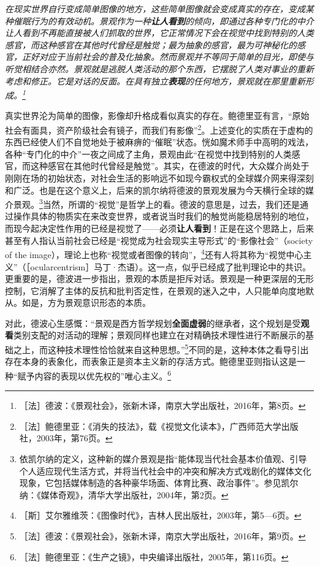 \documentclass[fontset=fandol, a4paper, 12pt, openright]{ctexbook}
\renewenvironment{quote}
  {\list{}{\rightmargin\leftmargin}%
   \item\relax\small\itshape\color{darkgray}}
  {\endlist}
\begin{document}
\begin{quote}
在现实世界自行变成简单图像的地方，这些简单图像就会变成真实的存在，变成某种催眠行为的有效动机。景观作为一种\textbf{让人看到}的倾向，即通过各种专门化的中介让人看到不再能直接被人们抓取的世界，它正常情况下会在视觉中找到特别的人类感官，而这种感官在其他时代曾经是触觉；最为抽象的感官，最为可神秘化的感官，正好对应于当前社会的普及化抽象。然而景观并不等同于简单的目光，即使与听觉相结合亦然。景观就是逃脱人类活动的那个东西，它摆脱了人类对事业的重新考虑和修正。它是对话的反面。在具有独立\textbf{表现}的任何地方，景观就在那里重新形成。\footnote{［法］德波：《景观社会》，张新木译，南京大学出版社，2016年，第8页。}
\end{quote}

真实世界沦为简单的图像，影像却升格成看似真实的存在。{\kaishu 鲍德里亚有言，“原始社会有面具，资产阶级社会有镜子，而我们有影像”\footnote{［法］鲍德里亚：《消失的技法》，载《视觉文化读本》，广西师范大学出版社，2003年，第76页。}。}上述变化的实质在于虚构的东西已经使人们不自觉地处于被麻痹的“催眠”状态。恍如魔术师手中高明的戏法，各种“专门化的中介”一夜之间成了主角，景观由此“在视觉中找到特别的人类感官，而这种感官在其他时代曾经是触觉”。{\kaishu 其实，在德波的时代，大众媒介尚处于刚刚在场的初始状态，对社会生活的影响远不如现今霸权式的全球媒介网来得深刻和广泛。也是在这个意义上，后来的凯尔纳将德波的景观发展为今天横行全球的媒介景观。\footnote{依凯尔纳的定义，这种新的媒介景观是指“能体现当代社会基本价值观、引导个人适应现代生活方式，并将当代社会中的冲突和解决方式戏剧化的媒体文化现象，它包括媒体制造的各种豪华场面、体育比赛、政治事件”。参见凯尔纳：《媒体奇观》，清华大学出版社，2004年，第2页。}}当然，所谓的“视觉”是哲学上的看。德波的意思是，过去，我们还是通过操作具体的物质实在来改变世界，或者说当时我们的触觉尚能稳居特别的地位，而现今起决定性作用的已经是视觉了——必须\textbf{让人看到}！{\kaishu 正是在这个思路上，后来甚至有人指认当前社会已经是“视觉成为社会现实主导形式”的“影像社会”（society of the image），理论上也称“视觉或者图像的转向”，\footnote{［斯］艾尔雅维茨：《图像时代》，吉林人民出版社，2003年，第5—6页。}还有人将其称为“视觉中心主义”（［ocularcentrism］马丁·杰语）。这一点，似乎已经成了批判理论中的共识。}更重要的是，德波进一步指出，景观的本质是拒斥对话。景观是一种更深层的无形控制，它消解了主体的反抗和批判否定性，在景观的迷入之中，人只能单向度地默从。如是，方为景观意识形态的本质。

对此，德波心生感慨：“景观是西方哲学规划\textbf{全面虚弱}的继承者，这个规划是受\textbf{观看}类别支配的对活动的理解；景观同样也建立在对精确技术理性进行不断展示的基础之上，而这种技术理性恰恰就来自这种思想。”\footnote{［法］德波：《景观社会》，张新木译，南京大学出版社，2016年，第9页。}不同的是，这种本体之看导引出存在本身的表象化，而表象正是资本主义新的存活方式。{\kaishu 鲍德里亚则指认这是一种“赋予内容的表现以优先权的”唯心主义。\footnote{［法］鲍德里亚：《生产之镜》，中央编译出版社，2005年，第116页。}}
\end{document}
